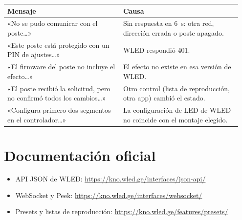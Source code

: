 \begin{longtable}{@{}>{\raggedright\arraybackslash}p{0.47\linewidth} >{\raggedright\arraybackslash}p{0.48\linewidth}@{}}
\toprule
\textbf{Mensaje} & \textbf{Causa} \\ \midrule \endhead
«No se pudo comunicar con el poste…» & Sin respuesta en 6~s: otra red, dirección errada o poste apagado. \\
«Este poste está protegido con un PIN de ajustes…» & WLED respondió 401. \\
«El firmware del poste no incluye el efecto…» & El efecto no existe en esa versión de WLED. \\
«El poste recibió la solicitud, pero no confirmó todos los cambios…» & Otro control (lista de reproducción, otra app) cambió el estado. \\
«Configura primero dos segmentos en el controlador…» & La configuración de LED de WLED no coincide con el montaje elegido. \\
\bottomrule
\end{longtable}

\section{Documentación oficial}

\begin{itemize}
\item API JSON de WLED: \url{https://kno.wled.ge/interfaces/json-api/}
\item WebSocket y Peek: \url{https://kno.wled.ge/interfaces/websocket/}
\item Presets y listas de reproducción: \url{https://kno.wled.ge/features/presets/}
\end{itemize}
